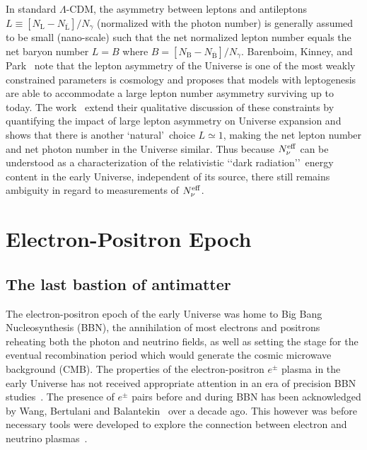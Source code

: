 \documentclass[universe,article,submit,moreauthors,pdftex,a4paper]{Definitions/mdpi}
\begin{document}
In standard $\Lambda$-CDM, the asymmetry between leptons and antileptons $L\equiv [N_\mathrm{L}-N_{\overline{\mathrm{L}}}] /N_\gamma $ (normalized with the photon number) is generally assumed to be small (nano-scale) such that the net normalized lepton number equals the net baryon number $L=B$ where $B=[N_\mathrm{B}-N_{\overline{\mathrm{B}}}]/N_\gamma $. Barenboim, Kinney, and Park~\cite{Barenboim:2016shh,Barenboim:2017dfq} note that the lepton asymmetry of the Universe is one of the most weakly constrained parameters is cosmology and proposes that models with leptogenesis are able to accommodate a large lepton number asymmetry surviving up to today. The work~\cite{Yang:2018oqg} extend their qualitative discussion of these constraints by quantifying the impact of large lepton asymmetry on Universe expansion and shows that there is another \lq natural\rq\ choice $L\simeq 1$, making the net lepton number and net photon number in the Universe similar. Thus because $N_{\nu}^{{\rm eff}}$ can be understood as a characterization of the relativistic \lq\lq dark radiation\rq\rq\ energy content in the early Universe, independent of its source, there still remains ambiguity in regard to measurements of $N_{\nu}^{\rm eff}$.

\section{Electron-Positron Epoch}\label{sec:ElectronPositron}
\subsection{The last bastion of antimatter}\label{sec:ElectronPositronDensity}
\noindent The electron-positron epoch of the early Universe was home to Big Bang Nucleosynthesis (BBN), the annihilation of most electrons and positrons reheating both the photon and neutrino fields, as well as setting the stage for the eventual recombination period which would generate the cosmic microwave background (CMB). The properties of the electron-positron $e^{\pm}$ plasma in the early Universe has not received appropriate attention in an era of precision BBN studies~\cite{Pitrou:2018cgg}. The presence of $e^{\pm}$ pairs before and during BBN has been acknowledged by Wang, Bertulani and Balantekin~\cite{Wang:2010px,Hwang:2021kno} over a decade ago. This however was before necessary tools were developed to explore the connection between electron and neutrino plasmas~\cite{Mangano:2005cc,Birrell:2012gg,Birrell:2014uka}.
\end{document}
